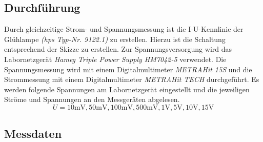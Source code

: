 \documentclass[a4paper, 11pt]{report}
\begin{document}
\subsection{Durchführung}
Durch gleichzeitige Strom- und Spannungsmessung ist die I-U-Kennlinie der Glühlampe \textit{(hps Typ-Nr. 9122.1)} zu erstellen. Hierzu ist die Schaltung entsprechend der Skizze zu erstellen. Zur Spannungsversorgung wird das Labornetzgerät \textit{Hameg Triple Power Supply HM7042-5} verwendet. Die Spannungsmessung wird mit einem Digitalmultimeter \textit{METRAHit 15S} und die Strommessung mit einem Digitalmultimeter \textit{METRAHit TECH} durchgeführt. Es werden folgende Spannungen am Labornetzgerät eingestellt und die jeweiligen Ströme und Spannungen an den Messgeräten abgelesen.
\[
U = 10\si{\milli\volt}, 50\si{\milli\volt}, 100\si{\milli\volt}, 500\si{\milli\volt}, 1\si{\volt}, 5\si{\volt}, 10\si{\volt}, 15\si{\volt}
\]

\newpage
\subsection{Messdaten}
\end{document}

